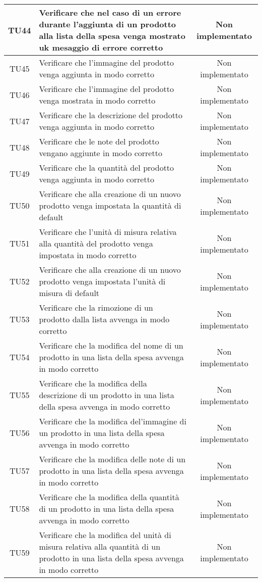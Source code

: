 \begin{center}
\begin{longtable}{|c|>{\centering}m{10cm}|c|}
		TU44 & Verificare che nel caso di un errore durante l'aggiunta di un prodotto alla lista della spesa venga mostrato uk mesaggio di errore corretto & Non implementato \\ \hline
		TU45 & Verificare che l'immagine del prodotto venga aggiunta in modo corretto & Non implementato \\ \hline
		TU46 & Verificare che l'immagine del prodotto venga mostrata in modo corretto & Non implementato \\ \hline
		TU47 & Verificare che la descrizione del prodotto venga aggiunta in modo corretto & Non implementato \\ \hline
		TU48 & Verificare che le note del prodotto vengano aggiunte in modo corretto & Non implementato \\ \hline
		TU49 & Verificare che la quantità del prodotto venga aggiunta in modo corretto & Non implementato \\ \hline
		TU50 & Verificare che alla creazione di un nuovo prodotto venga impostata la quantità di default & Non implementato \\ \hline
		TU51 & Verificare che l'unità di misura relativa alla quantità del prodotto venga impostata in modo corretto & Non implementato \\ \hline
		TU52 & Verificare che alla creazione di un nuovo prodotto venga impostata l'unità di misura di default & Non implementato \\ \hline
		TU53 & Verificare che la rimozione di un prodotto dalla lista avvenga in modo corretto & Non implementato \\ \hline
		TU54 & Verificare che la modifica del nome di un prodotto in una lista della spesa avvenga in modo corretto & Non implementato \\ \hline
		TU55 & Verificare che la modifica della descrizione di un prodotto in una lista della spesa avvenga in modo corretto & Non implementato \\ \hline
		TU56 & Verificare che la modifica del'immagine di un prodotto in una lista della spesa avvenga in modo corretto & Non implementato \\ \hline
		TU57 & Verificare che la modifica delle note di un prodotto in una lista della spesa avvenga in modo corretto & Non implementato \\ \hline
		TU58 & Verificare che la modifica della quantità di un prodotto in una lista della spesa avvenga in modo corretto & Non implementato \\ \hline
		TU59 & Verificare che la modifica del unità di misura relativa alla quantità di un prodotto in una lista della spesa avvenga in modo corretto & Non implementato \\ \hline

\end{longtable}
\end{center}
